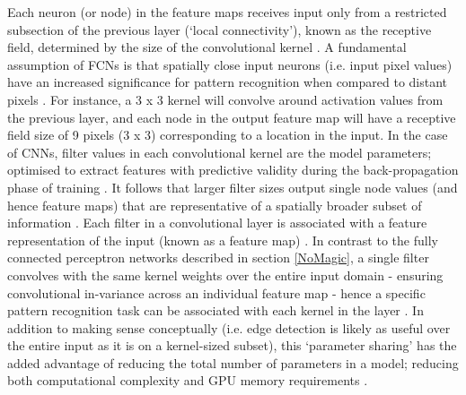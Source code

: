 Each neuron (or node) in the feature maps receives input only from a restricted subsection of the previous layer (`local connectivity'), known as the receptive field, determined by the size of the convolutional kernel \cite{Hesamian2019}. A fundamental assumption of FCNs is that spatially close input neurons (i.e. input pixel values) have an increased significance for pattern recognition when compared to distant pixels \cite{Hu2015}. For instance, a 3 x 3 kernel will convolve around activation values from the previous layer, and each node in the output feature map will have a receptive field size of 9 pixels (3 x 3) corresponding to a location in the input. In the case of CNNs, filter values in each convolutional kernel are the model parameters; optimised to extract features with predictive validity during the back-propagation phase of training \cite{Maier2019}. It follows that larger filter sizes output single node values (and hence feature maps) that are representative of a spatially broader subset of information \cite{Nemoto_2020}. Each filter in a convolutional layer is associated with a feature representation of the input (known as a feature map) \cite{Hesamian2019}. In contrast to the fully connected perceptron networks described in section \ref{NoMagic}, a single filter convolves with the same kernel weights over the entire input domain - ensuring convolutional in-variance across an individual feature map \cite{Maier2019} - hence a specific pattern recognition task can be associated with each kernel in the layer \cite{Zeiler_2014}. In addition to making sense conceptually (i.e. edge detection is likely as useful over the entire input as it is on a kernel-sized subset), this `parameter sharing' has the added advantage of reducing the total number of parameters in a model; reducing both computational complexity and GPU memory requirements \cite{Lundervold2019}.

